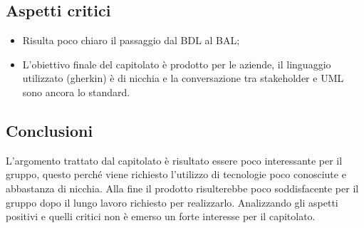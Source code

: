 \subsection{Aspetti critici}
\begin{itemize}
\item Risulta poco chiaro il passaggio dal BDL al BAL;
\item L'obiettivo finale del capitolato è prodotto per le aziende, il linguaggio utilizzato (gherkin) è di nicchia e la conversazione tra stakeholder e UML sono ancora lo standard.
\end{itemize}

\subsection{Conclusioni}
L'argomento trattato dal capitolato è risultato essere poco interessante per il gruppo, questo perché viene richiesto l'utilizzo di tecnologie poco conosciute e abbastanza di nicchia. Alla fine il prodotto risulterebbe poco soddisfacente per il gruppo dopo il lungo lavoro richiesto per realizzarlo.
Analizzando gli aspetti positivi e quelli critici non è emerso un forte interesse per il capitolato.